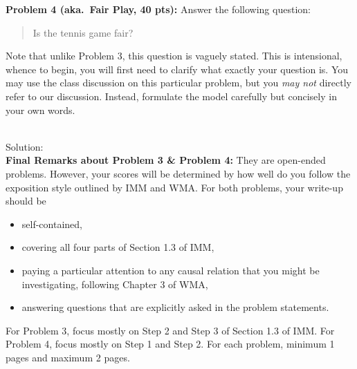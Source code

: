 \documentclass[12pt]{article}
\begin{document}
\newpage
\vskip0.25in
\noindent\textbf{Problem 4 (aka.\ Fair Play, 40 pts):}
Answer the following question:
\begin{verse}
Is the tennis game fair?
\end{verse}
Note that unlike Problem 3, this question is vaguely stated.
This is intensional, whence to begin, you will first need to clarify
what exactly your question is.
You may use the class discussion on this particular 
problem, but you \emph{may not} directly refer to our 
discussion.  Instead, formulate the model carefully but concisely in 
your own words.   

\noindent\ \\Solution:\\






\vskip0.25in
\noindent\textbf{Final Remarks about Problem 3 \& Problem 4:} 
They are open-ended problems.  However, your scores will be determined
by how well do you follow the exposition style outlined by IMM and
WMA.  For both problems, your write-up should be 
\begin{itemize}
\item self-contained,
\item covering all four parts of Section 1.3 of IMM,
\item paying a particular attention to any causal relation that you
  might be investigating, following Chapter 3 of WMA,
\item answering questions that are explicitly asked in the problem statements.
\end{itemize}
For Problem 3, focus mostly on Step 2 and Step 3 of Section
1.3 of IMM.  For Problem 4, focus mostly on Step 1 and Step
2.  For each problem, minimum 1 pages and maximum 2 pages.
\end{document}
